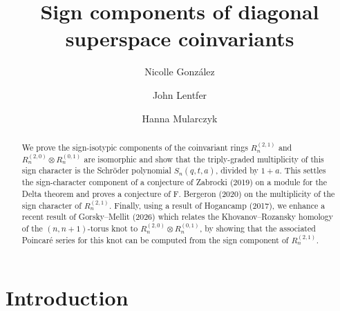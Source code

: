 \documentclass[11pt, noadjust, reqno]{amsart}
\theoremstyle{definition}
\theoremstyle{remark}
\numberwithin{equation}{section}
\newcommand{\0}{\emptyset}
\begin{document}
\title{Sign components of diagonal superspace coinvariants}


\author[N. González]{Nicolle González}
\address{Department of Mathematics\\
         University of British Columbia, Vancouver, BC, Canada}

\author[J. Lentfer]{John Lentfer}
\address{Department of Mathematics\\
         University of California, San Diego, CA, USA}

\author[H. Mularczyk]{Hanna Mularczyk}
\address{Department of Mathematics\\
        Massachusetts Institute of Technology, Cambridge, MA, USA}

\begin{abstract}
We prove the sign-isotypic components of the coinvariant rings $R_n^{(2,1)}$ and $R_n^{(2,0)} \otimes R_n^{(0,1)}$ are isomorphic and show that the triply-graded multiplicity of this sign character is the Schr\"oder polynomial $S_n(q,t,a)$, divided by $1+a$.
This settles the sign-character component of a conjecture of Zabrocki (2019) on a module for the Delta theorem and proves a conjecture of F. Bergeron (2020) on the multiplicity of the sign character of $R_n^{(2,1)}$. 
Finally, using a result of Hogancamp (2017), we enhance a recent result of Gorsky--Mellit (2026) which relates the Khovanov--Rozansky homology of the $(n,n+1)$-torus knot to $R_n^{(2,0)} \otimes R_n^{(0,1)}$, by showing that the associated Poincar\'e series for this knot can be computed from the sign component of $R_n^{(2,1)}$. 

\end{abstract}


\maketitle


\section{Introduction}
\end{document}
